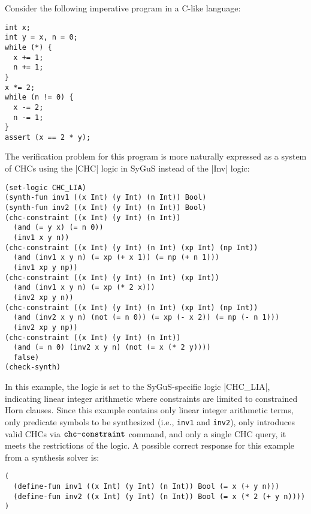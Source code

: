 \documentclass[english,a4paper,10pt]{article}
\begin{document}
\begin{example}
Consider the following imperative program in a C-like language:
\begin{lstlisting}[language=C-Like]
int x;
int y = x, n = 0;
while (*) {
  x += 1;
  n += 1;
}
x *= 2;
while (n != 0) {
  x -= 2;
  n -= 1;
}
assert (x == 2 * y);
\end{lstlisting}
The verification problem for this program is more naturally expressed as a system of CHCs
using the \code|CHC| logic in SyGuS instead of the \code|Inv| logic:
\begin{lstlisting}[language=SyGuS]
(set-logic CHC_LIA)
(synth-fun inv1 ((x Int) (y Int) (n Int)) Bool)
(synth-fun inv2 ((x Int) (y Int) (n Int)) Bool)
(chc-constraint ((x Int) (y Int) (n Int))
  (and (= y x) (= n 0))
  (inv1 x y n))
(chc-constraint ((x Int) (y Int) (n Int) (xp Int) (np Int))
  (and (inv1 x y n) (= xp (+ x 1)) (= np (+ n 1)))
  (inv1 xp y np))
(chc-constraint ((x Int) (y Int) (n Int) (xp Int))
  (and (inv1 x y n) (= xp (* 2 x)))
  (inv2 xp y n))
(chc-constraint ((x Int) (y Int) (n Int) (xp Int) (np Int))
  (and (inv2 x y n) (not (= n 0)) (= xp (- x 2)) (= np (- n 1)))
  (inv2 xp y np))
(chc-constraint ((x Int) (y Int) (n Int))
  (and (= n 0) (inv2 x y n) (not (= x (* 2 y))))
  false)
(check-synth)
\end{lstlisting}
In this example, the logic is set to the SyGuS-specific logic
\code|CHC_LIA|, indicating linear integer arithmetic
where constraints are limited to constrained Horn clauses.
Since this example contains only linear integer arithmetic terms,
only predicate symbols to be synthesized (i.e., \texttt{inv1} and \texttt{inv2}),
only introduces valid CHCs via $\texttt{chc-constraint}$ command, and
only a single CHC query,
it meets the restrictions of the logic.
A possible correct response for this example from a synthesis solver is:
\begin{lstlisting}[language=SyGuS]
(
  (define-fun inv1 ((x Int) (y Int) (n Int)) Bool (= x (+ y n)))
  (define-fun inv2 ((x Int) (y Int) (n Int)) Bool (= x (* 2 (+ y n))))
)
\end{lstlisting}
\end{example}
\end{document}
